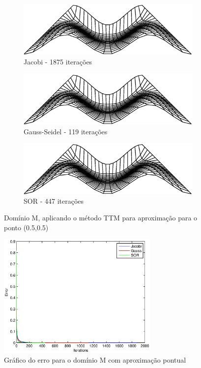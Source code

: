 \documentclass{article}
\begin{document}
		\begin{figure}
		\centering
			\begin{subfigure}[b]{0.45\textwidth}
				\centering
				\includegraphics[width=\textwidth]{figures/m-ttm-jacobi.eps}
				\caption{Jacobi - 1875 iterações}
			\end{subfigure}
			\begin{subfigure}[b]{0.45\textwidth}
				\centering
				\includegraphics[width=\textwidth]{figures/m-ttm-gauss.eps}
				\caption{Gauss-Seidel - 119 iterações}
			\end{subfigure}
			\begin{subfigure}[b]{0.45\textwidth}
				\centering
				\includegraphics[width=\textwidth]{figures/m-ttm-sor.eps}
				\caption{SOR - 447 iterações}
			\end{subfigure}
			\caption{Domínio M, aplicando o método TTM para aproximação para o ponto (0.5,0.5)}
			\label{fig:m:ttm}
			\centering
			\includegraphics[width=0.7\textwidth]{figures/m-ttm-error.eps}
			\caption{Gráfico do erro para o domínio M com aproximação pontual}
			\label{fig:m:ttm:erro}
		\end{figure}
	
\end{document}
